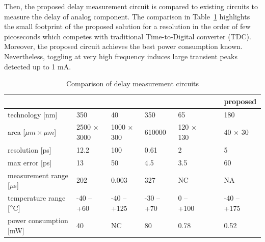 Then, the proposed delay measurement circuit is compared to existing circuits to measure the delay of analog component. The comparison in Table~\ref{tbl:delay-measurement-comparison} highlights the small footprint of the proposed solution for a resolution in the order of few picoseconds which competes with traditional Time-to-Digital converter (TDC). Moreover, the proposed circuit achieves the best power consumption known. Nevertheless, toggling at very high frequency induces large transient peaks detected up to 1 mA. 

\renewcommand*{\thefootnote}{\fnsymbol{footnote}}
\begin{table}[htp]
    \centering
    \caption{Comparison of delay measurement circuits}
    \label{tbl:delay-measurement-comparison}
    \begin{tabular}{@{}llllllll@{}}
    \toprule
                                      & \cite{1637593} & \cite{6233014} & \cite{7312496} & \cite{7560219} &  &  & \textbf{proposed} \\ \midrule
    technology  [nm]                  & 350         & 40          & 350        & 65        &  &  & 180              \\
    area [\(\mu m \times \mu m\)]     & 2500 $\times$ 3000 & 1000 $\times$ 300  & 610000     & 120 $\times$ 130 &  &  & 40 $\times$ 30           \\
    resolution [ps]                   & 12.2        & 100         & 0.61       & 2         &  &  & 5\footnotemark                 \\
    max error [ps]                    & 13          & 50          & 4.5        & 3.5       &  &  & 60             \\
    measurement range [\(\mu\)s]      & 202         & 0.003       & 327        & NC        &  &  & NA             \\
    temperature range [\(\degree \)C] & -40 -- +60  & -40 -- +125 & -30 -- +70 & 0 -- +100 &  &  & -40 -- +175       \\
    power consumption [mW]            & 40          & NC          & 80         & 0.78      &  &  & 0.52              \\ \bottomrule
    \end{tabular}
\end{table}

\renewcommand*{\thefootnote}{\arabic{footnote}}
\setcounter{footnote}{0}

